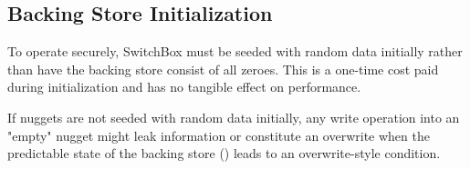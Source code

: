 \subsection{Backing Store Initialization}

To operate securely, SwitchBox must be seeded with random data initially rather
than have the backing store consist of all zeroes. This is a one-time cost paid
during initialization and has no tangible effect on performance.

If nuggets are not seeded with random data initially, any write operation into
an "empty" nugget might leak information or constitute an overwrite when the
predictable state of the backing store () leads to
an overwrite-style condition.
